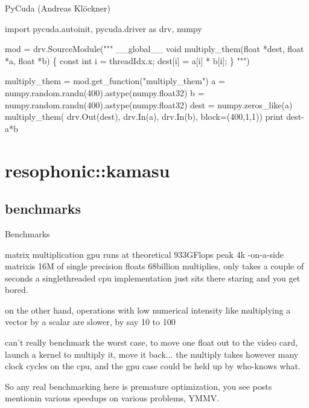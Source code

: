 \begin{frame}[fragile]{PyCuda (Andreas Kl\"ockner)}
  \begin{semiverbatim}import pycuda.autoinit, pycuda.driver as drv, numpy

mod = drv.SourceModule("""
__global__ void multiply_them(float *dest, float *a, float *b)
\{
  const int i = threadIdx.x;
  dest[i] = a[i] * b[i];
\}
""")

multiply_them = mod.get_function("multiply_them")
a = numpy.random.randn(400).astype(numpy.float32)
b = numpy.random.randn(400).astype(numpy.float32)
dest = numpy.zeros_like(a)
multiply_them(
    drv.Out(dest), drv.In(a), drv.In(b),
    block=(400,1,1))
print dest-a*b
  \end{semiverbatim}



\end{frame}

\section{resophonic::kamasu}
\subsection{benchmarks}

\begin{frame}{Benchmarks}
\end{frame}


\begin{frame}{matrix multiplication}
gpu runs at theoretical 933GFlops peak 4k -on-a-side matrixis 16M of
single precision floats 68billion multiplies, only takes a couple of
seconds a singlethreaded cpu implementation just sits there staring
and you get bored.

on the other hand, operations with low numerical intensity like
multiplying a vector by a scalar are slower, by say 10 to 100

can't really benchmark the worst case, to move one float out to the
video card, launch a kernel to multiply it, move it back... the
multiply takes however many clock cycles on the cpu, and the gpu case
could be held up by who-knows what.   

So any real benchmarking here is premature optimization, you see posts
mentionin various speedups on various problems, YMMV.  
\end{frame}

